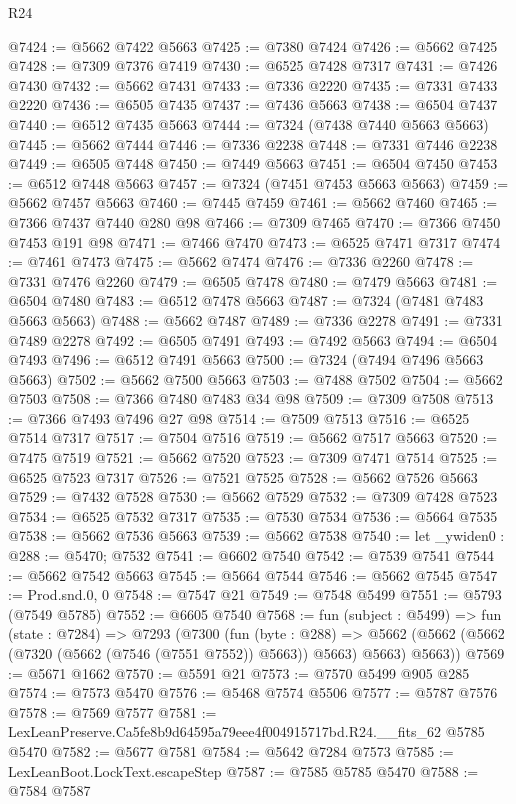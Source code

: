\begin{lexlean}{R24}
\begin{coremodule}
@7424 := @5662 @7422 @5663
@7425 := @7380 @7424
@7426 := @5662 @7425
@7428 := @7309 @7376 @7419
@7430 := @6525 @7428 @7317
@7431 := @7426 @7430
@7432 := @5662 @7431
@7433 := @7336 @2220
@7435 := @7331 @7433 @2220
@7436 := @6505 @7435
@7437 := @7436 @5663
@7438 := @6504 @7437
@7440 := @6512 @7435 @5663
@7444 := @7324 (@7438 @7440 @5663 @5663)
@7445 := @5662 @7444
@7446 := @7336 @2238
@7448 := @7331 @7446 @2238
@7449 := @6505 @7448
@7450 := @7449 @5663
@7451 := @6504 @7450
@7453 := @6512 @7448 @5663
@7457 := @7324 (@7451 @7453 @5663 @5663)
@7459 := @5662 @7457 @5663
@7460 := @7445 @7459
@7461 := @5662 @7460
@7465 := @7366 @7437 @7440 @280 @98
@7466 := @7309 @7465
@7470 := @7366 @7450 @7453 @191 @98
@7471 := @7466 @7470
@7473 := @6525 @7471 @7317
@7474 := @7461 @7473
@7475 := @5662 @7474
@7476 := @7336 @2260
@7478 := @7331 @7476 @2260
@7479 := @6505 @7478
@7480 := @7479 @5663
@7481 := @6504 @7480
@7483 := @6512 @7478 @5663
@7487 := @7324 (@7481 @7483 @5663 @5663)
@7488 := @5662 @7487
@7489 := @7336 @2278
@7491 := @7331 @7489 @2278
@7492 := @6505 @7491
@7493 := @7492 @5663
@7494 := @6504 @7493
@7496 := @6512 @7491 @5663
@7500 := @7324 (@7494 @7496 @5663 @5663)
@7502 := @5662 @7500 @5663
@7503 := @7488 @7502
@7504 := @5662 @7503
@7508 := @7366 @7480 @7483 @34 @98
@7509 := @7309 @7508
@7513 := @7366 @7493 @7496 @27 @98
@7514 := @7509 @7513
@7516 := @6525 @7514 @7317
@7517 := @7504 @7516
@7519 := @5662 @7517 @5663
@7520 := @7475 @7519
@7521 := @5662 @7520
@7523 := @7309 @7471 @7514
@7525 := @6525 @7523 @7317
@7526 := @7521 @7525
@7528 := @5662 @7526 @5663
@7529 := @7432 @7528
@7530 := @5662 @7529
@7532 := @7309 @7428 @7523
@7534 := @6525 @7532 @7317
@7535 := @7530 @7534
@7536 := @5664 @7535
@7538 := @5662 @7536 @5663
@7539 := @5662 @7538
@7540 := let _ywiden0 : @288 := @5470; @7532
@7541 := @6602 @7540
@7542 := @7539 @7541
@7544 := @5662 @7542 @5663
@7545 := @5664 @7544
@7546 := @5662 @7545
@7547 := Prod.snd.{0, 0}
@7548 := @7547 @21
@7549 := @7548 @5499
@7551 := @5793 (@7549 @5785)
@7552 := @6605 @7540
@7568 := fun (subject : @5499) =>
  fun (state : @7284) =>
  @7293
    (@7300
      (fun (byte : @288) =>
      @5662 (@5662 (@5662 (@7320 (@5662 (@7546 (@7551 @7552)) @5663)) @5663) @5663) @5663))
@7569 := @5671 @1662
@7570 := @5591 @21
@7573 := @7570 @5499 @905 @285
@7574 := @7573 @5470
@7576 := @5468 @7574 @5506
@7577 := @5787 @7576
@7578 := @7569 @7577
@7581 := LexLeanPreserve.Ca5fe8b9d64595a79eee4f004915717bd.R24.__fits_62 @5785 @5470
@7582 := @5677 @7581
@7584 := @5642 @7284 @7573
@7585 := LexLeanBoot.LockText.escapeStep
@7587 := @7585 @5785 @5470
@7588 := @7584 @7587

\end{coremodule}
\end{lexlean}
